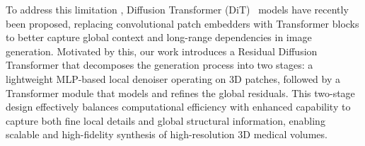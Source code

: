 To address this limitation , Diffusion Transformer (DiT)~\citep{Peebles2022DiT} models have recently been proposed, replacing convolutional patch embedders with Transformer blocks to better capture global context and long-range dependencies in image generation.  Motivated by this, our work introduces a Residual Diffusion Transformer that decomposes the generation process into two stages: a lightweight MLP-based local denoiser operating on 3D patches, followed by a Transformer module that models and refines the global residuals. This two-stage design effectively balances computational efficiency with enhanced capability to capture both fine local details and global structural information, enabling scalable and high-fidelity synthesis of high-resolution 3D medical volumes.